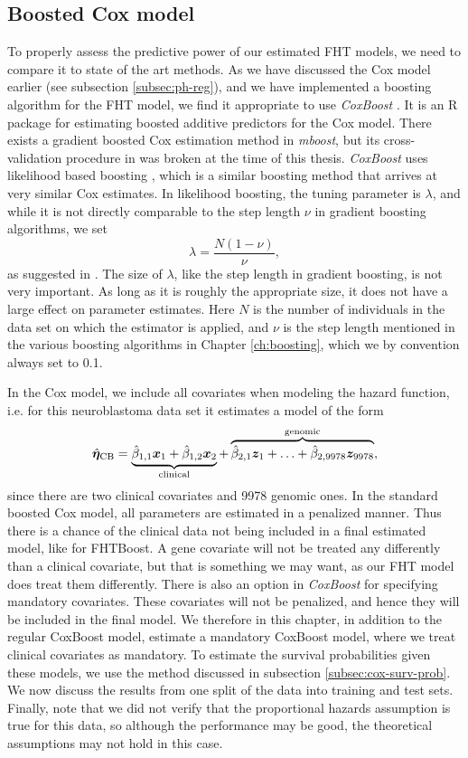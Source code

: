 \subsection{Boosted Cox model}
To properly assess the predictive power of our estimated FHT models, we need to compare it to state of the art methods.
As we have discussed the Cox model earlier (see subsection \ref{subsec:ph-reg}), and we have implemented a boosting algorithm for the FHT model, we find it appropriate to use \textit{CoxBoost} \citep{coxboost}.
It is an R package for estimating boosted additive predictors for the Cox model.
There exists a gradient boosted Cox estimation method in \textit{mboost}, but its cross-validation procedure in was broken at the time of this thesis. 
\textit{CoxBoost} uses likelihood based boosting \citep{gamboost}, which is a similar boosting method that arrives at very similar Cox estimates.
In likelihood boosting, the tuning parameter is $\lambda$, and while it is not directly comparable to the step length $\nu$ in gradient boosting algorithms, we set
\begin{equation}\label{eq:lambda-nu}
    \lambda=\frac{N(1-\nu)}{\nu},
\end{equation}
as suggested in \citet{DeBin2016}.
The size of $\lambda$, like the step length in gradient boosting, is not very important.
As long as it is roughly the appropriate size, it does not have a large effect on parameter estimates.
Here $N$ is the number of individuals in the data set on which the estimator is applied, and $\nu$ is the step length mentioned in the various boosting algorithms in Chapter \ref{ch:boosting}, which we by convention always set to 0.1.

In the Cox model, we include all covariates when modeling the hazard function, i.e. for this neuroblastoma data set it estimates a model of the form
\begin{equation*}
    \hat{\boldsymbol{\eta}}_{\text{CB}}=\underbrace{\hat{\beta}_{1,1}\bm{x}_1+\hat{\beta}_{1,2}\bm{x}_{2}}_{\text{clinical}}+\overbrace{\hat{\beta}_{2,1}\bm{z}_1+\ldots+\hat{\beta}_{2,9978}\bm{z}_{9978}}^{\text{genomic}},
\end{equation*}
since there are two clinical covariates and 9978 genomic ones.
In the standard boosted Cox model, all parameters are estimated in a penalized manner.
Thus there is a chance of the clinical data not being included in a final estimated model, like for FHTBoost.
A gene covariate will not be treated any differently than a clinical covariate, but that is something we may want, as our FHT model does treat them differently.
There is also an option in \textit{CoxBoost} for specifying mandatory covariates.
These covariates will not be penalized, and hence they will be included in the final model.
We therefore in this chapter, in addition to the regular CoxBoost model, estimate a mandatory CoxBoost model, where we treat clinical covariates as mandatory.
To estimate the survival probabilities given these models, we use the method discussed in subsection \ref{subsec:cox-surv-prob}.
We now discuss the results from one split of the data into training and test sets.
Finally, note that we did not verify that the proportional hazards assumption is true for this data, so although the performance may be good, the theoretical assumptions may not hold in this case.

